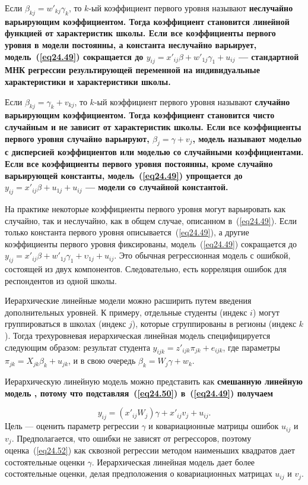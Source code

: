 Если $\beta_{kj} = w'_{kj} \gamma_k$, то $k$-ый коэффициент первого уровня называют \bfseries неслучайно варьирующим коэффициентом. \mdseries  Тогда коэффициент становится линейной функцией от характеристик школы. Если все коэффициенты первого уровня в модели постоянны, а константа неслучайно варьирует, модель~(\ref{eq24.49}) сокращается до $y_{ij} = x'_{ij} \beta + w'_{1j} \gamma_1 + u_{ij}$ --- стандартной МНК регрессии результирующей переменной на индивидуальные характеристики и характеристики школы. 

Если $\beta_{kj} = \gamma_k + v_{kj}$, то $k$-ый коэффициент первого уровня называют \bfseries случайно варьирующим коэффициентом. \mdseries Тогда коэффициент становится чисто случайным и не зависит от характеристик школы. Если все коэффициенты первого уровня случайно варьируют, $\beta_j = \gamma + v_j$, модель называют \bfseries моделью с дисперсией коэффициентов \mdseries или моделью со случайными коэффициентами. Если все коэффициенты первого уровня постоянны, кроме случайно варьирующей константы, модель~(\ref{eq24.49}) упрощается до $y_{ij} = x'_{ij} \beta + u_{1j} + u_{ij}$ --- модели со случайной константой. 

На практике некоторые коэффициенты первого уровня могут варьировать как случайно, так и неслучайно, как в общем случае, описанном в~(\ref{eq24.49}). Если только константа первого уровня описывается~(\ref{eq24.49}), а другие коэффициенты первого уровня фиксированы, модель~(\ref{eq24.49}) сокращается до $y_{ij} = x'_{ij} \beta + w'_{1j} \gamma_1 + \upsilon_{1j} + u_{ij}$. Это обычная регрессионная модель с ошибкой, состоящей из двух компонентов. Следовательно, есть корреляция ошибок для респондентов из одной школы. 

Иерархические линейные модели можно расширить путем введения дополнительных уровней. К примеру, отдельные студенты (индекс $i$) могут группироваться в школах (индекс $j$), которые сгруппированы в регионы (индекс $k$). Тогда трехуровневая иерархическая линейная модель специфицируется следующим образом: результат студента $y_{ijk} = z'_{ijk} \pi_{jk} + e_{ijk}$, где параметры $\pi_{jk} = X_{jk} \beta_{k} + u_{jk}$, и в свою очередь $\beta_k = W_j \gamma + w_k$. 

Иерархическую линейную модель можно представить как \bfseries смешанную линейную модель \mdseries, потому что подставляя~(\ref{eq24.50}) в~(\ref{eq24.49}) получаем

\begin{equation}
\label{eq24.52}
y_{ij} = (x'_{ij} W_j) \gamma + x'_{ij} v_j + u_{ij}.
\end{equation}
Цель --- оценить параметр регрессии $\gamma$ и ковариационные матрицы ошибок $u_{ij}$ и $v_j$. Предполагается, что ошибки не зависят от регрессоров, поэтому оценка~(\ref{eq24.52}) как сквозной регрессии методом наименьших квадратов дает состоятельные оценки $\gamma$. Иерархическая линейная модель дает более состоятельные оценки, делая предположения о ковариационных матрицах $u_{ij}$ и $v_j$. 

